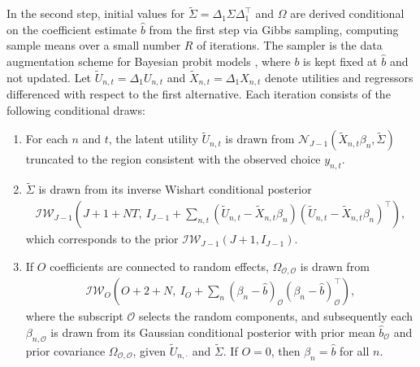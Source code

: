 \documentclass[preprint,12pt,authoryear]{elsarticle}
\newcommand{\Normal}[2]{\mathcal{N}_{#1}\left(#2 \right)}
\newcommand{\IW}[2]{\mathcal{IW}_{#1}\left(#2 \right)}
\newcommand{\Oset}{{\mathcal O}}
\begin{document}
In the second step, initial values for $\tilde{\Sigma} = \Delta_1 \Sigma \Delta_1^\top$ and $\Omega$ are derived conditional on the coefficient estimate $\hat{b}$ from the first step via Gibbs sampling, computing sample means over a small number $R$ of iterations. The sampler is the data augmentation scheme for Bayesian probit models \citep{Albert1993, McCulloch1994}, where $b$ is kept fixed at $\hat{b}$ and not updated. Let $\tilde{U}_{n,t} = \Delta_1 U_{n,t}$ and $\tilde{X}_{n,t} = \Delta_1 X_{n,t}$ denote utilities and regressors differenced with respect to the first alternative. Each iteration consists of the following conditional draws:
%
\begin{enumerate}
    \item For each $n$ and $t$, the latent utility $\tilde{U}_{n,t}$ is drawn from $\Normal{J-1}{\tilde{X}_{n,t} \beta_n, \tilde{\Sigma}}$ truncated to the region consistent with the observed choice $y_{n,t}$.
    \item $\tilde{\Sigma}$ is drawn from its inverse Wishart conditional posterior
    \begin{align*}
        \IW{J-1}{J + 1 + NT,\ I_{J-1} + \sum_{n,t} (\tilde{U}_{n,t} - \tilde{X}_{n,t} \beta_n)(\tilde{U}_{n,t} - \tilde{X}_{n,t} \beta_n)^\top},
    \end{align*}
    which corresponds to the prior $\IW{J-1}{J+1, I_{J-1}}$.
    \item If $O$ coefficients are connected to random effects, $\Omega_{\Oset,\Oset}$ is drawn from
    \begin{align*}
        \IW{O}{O + 2 + N,\ I_{O} + \sum_{n} (\beta_{n} - \hat{b})_{\Oset} (\beta_{n} - \hat{b})_{\Oset}^\top},
    \end{align*}
    where the subscript $\Oset$ selects the random components, and subsequently each $\beta_{n,\Oset}$ is drawn from its Gaussian conditional posterior with prior mean $\hat{b}_{\Oset}$ and prior covariance $\Omega_{\Oset,\Oset}$, given $\tilde{U}_{n,\cdot}$ and $\tilde{\Sigma}$.
    If $O = 0$, then $\beta_n = \hat{b}$ for all $n$.
\end{enumerate}
\end{document}
